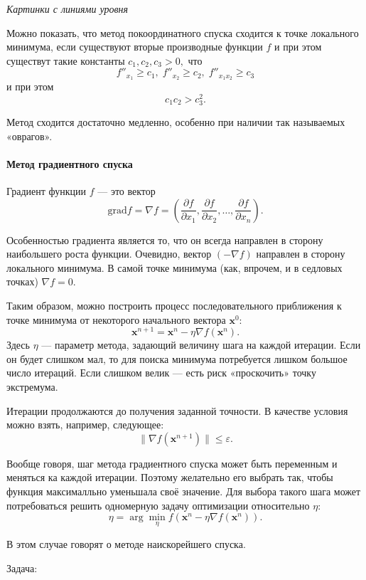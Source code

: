 \emph{Картинки с линиями уровня}

Можно показать, что метод покоординатного спуска сходится к точке
локального минимума, если существуют вторые производные функции $f$
и при этом существут такие константы $c_{1},c_{2},c_{3}>0,$ что
\[
f''_{x_{1}}\geqslant c_{1},\; f''_{x_{2}}\geqslant c_{2},\; f''_{x_{1}x_{2}}\geqslant c_{3}
\]
и при этом
\[
c_{1}c_{2}>c_{3}^{2}.
\]


Метод сходится достаточно медленно, особенно при наличии так называемых
«оврагов».


\paragraph{Метод градиентного спуска}

Градиент функции $f$ — это вектор
\[
\mathrm{grad}f=\nabla f=\left(\frac{\partial f}{\partial x_{1}},\frac{\partial f}{\partial x_{2}},\dots,\frac{\partial f}{\partial x_{n}}\right).
\]


Особенностью градиента является то, что он всегда направлен в сторону
наибольшего роста функции. Очевидно, вектор $(-\nabla f)$ направлен
в сторону локального минимума. В самой точке минимума (как, впрочем,
и в седловых точках) $\nabla f=0$.

Таким образом, можно построить процесс последовательного приближения
к точке минимума от некоторого начального вектора $\mathbf{x}^{0}$:
\[
\mathbf{x}^{n+1}=\mathbf{x}^{n}-\eta\nabla f(\mathbf{x}^{n}).
\]
Здесь $\eta$ — параметр метода, задающий величину шага на каждой
итерации. Если он будет слишком мал, то для поиска минимума потребуется
лишком большое число итераций. Если слишком велик — есть риск «проскочить»
точку экстремума.

Итерации продолжаются до получения заданной точности. В качестве условия
можно взять, например, следующее:
\[
\|\nabla f(\mathbf{x}^{n+1})\|\leqslant\varepsilon.
\]


Вообще говоря, шаг метода градиентного спуска может быть переменным
и меняться ка каждой итерации. Поэтому желательно его выбрать так,
чтобы функция максималльно уменьшала своё значение. Для выбора такого
шага может потребоваться решить одномерную задачу оптимизации относительно
$\eta$:
\[
\eta=\arg\min_{\eta}f(\mathbf{x}^{n}-\eta\nabla f(\mathbf{x}^{n})).
\]


В этом случае говорят о методе наискорейшего спуска.

\Practice

\Tasks
Задача:

